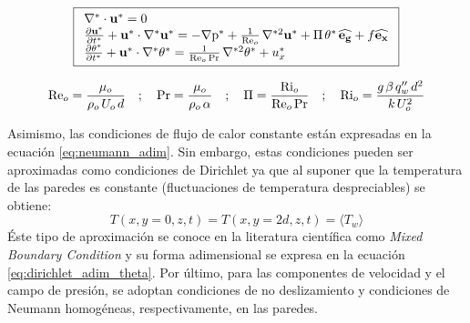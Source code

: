 \begin{equation}
\boxed{
\begin{array}{l}
    \nabla^* \cdot \mathbf{u^*} = 0 \\
    \frac{\partial \mathbf{u^*}}{\partial t^*} + \mathbf{u^*} \cdot \nabla^* \mathbf{u^*} = 
    -\nabla \text{p}^* + \frac{1}{\text{Re}_o} \hspace{0.5mm} \nabla^{*2} \mathbf{u^*} + \Pi \hspace{0.5mm} \theta^* \hspace{0.5mm} \mathbf{\widehat{e_g}} + f \mathbf{\widehat{e_x}}  \\
    \frac{\partial \theta^*}{\partial t^*} + \mathbf{u^*} \cdot \nabla^* \theta^* = 
    \frac{1}{\text{Re}_o \hspace{0.5mm} \text{Pr}} \hspace{0.5mm} \nabla^{*2} \theta^* + u_x^* 
\end{array}
}
\label{eq:gob_system_adim}
\end{equation}

\begin{equation}
\text{Re}_o = \frac{\mu_o}{\rho_o \hspace{0.5mm} U_o \hspace{0.5mm} d } \quad ; \quad \text{Pr}= \frac{\mu_o}{\rho_o \hspace{0.5mm} \alpha} \quad ; \quad \Pi = \frac{\text{Ri}_o}{\text{Re}_o \hspace{0.5mm} \text{Pr}} \quad ; \quad \text{Ri}_o = \frac{g \hspace{0.5mm} \beta \hspace{0.5mm} q''_w \hspace{0.5mm} d^2}{k \hspace{0.5mm} U_o^2}
\label{eq:num_adim}
\end{equation}

Asimismo, las condiciones de flujo de calor constante están expresadas en la ecuación \ref{eq:neumann_adim}. Sin embargo, estas condiciones pueden ser aproximadas como condiciones de Dirichlet ya que al suponer que la temperatura de las paredes es constante (fluctuaciones de temperatura despreciables) se obtiene: 
$$T(x,y=0,z,t) = T(x,y=2d,z,t) = \langle T_w \rangle$$ 
Éste tipo de aproximación se conoce en la literatura científica como \textit{Mixed Boundary Condition} \cite{straub2019influence} y su forma adimensional se expresa en la ecuación \ref{eq:dirichlet_adim_theta}. Por último, para las componentes de velocidad y el campo de presión, se adoptan condiciones de no deslizamiento y condiciones de Neumann homogéneas, respectivamente, en las paredes. 

